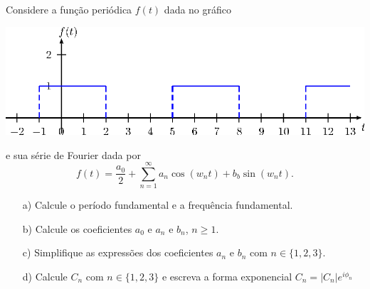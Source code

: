 \begin{exeresol}Considere a função periódica $f(t)$ dada no gráfico

  \begin{center}
    \includegraphics{cap_diagramas_espectro/pics/grafico_func_quadrada_sem_paridade}
  \end{center}
  
  
  e sua série de Fourier dada por
  $$
  f(t)= \frac{a_0}{2}+\sum_{n=1}^\infty a_n\cos(w_n t)+b_b\sin(w_nt).$$
  \begin{itemize}
    \item[a)]  Calcule o período fundamental e a frequência fundamental.
     \item[b)]  Calcule os coeficientes $a_0$ e $a_n$ e $b_n$, $n\geq 1$. 
      \item[c)]  Simplifique as expressões dos coeficientes $a_n$ e $b_n$ com $n\in\{1,2,3\}$.
      \item[d)] Calcule $C_n$ com $n\in\{1,2,3\}$ e escreva a forma exponencial $C_n=|C_n|e^{i\phi_n}$ 
  \end{itemize}
\end{exeresol}

